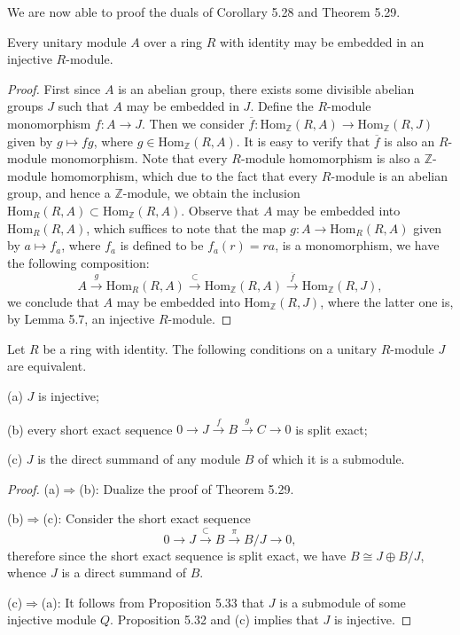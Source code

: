 We are now able to proof the duals of Corollary 5.28 and Theorem 5.29.
\begin{proposition}
Every unitary module $A$ over a ring $R$ with identity may be embedded in an injective $R$-module.
\end{proposition}
\begin{proof}
First since $A$ is an abelian group, there exists some divisible abelian groups $J$ such that $A$ may be embedded in $J$. Define the $R$-module monomorphism $f:A\to J$. Then we consider $\overline{f}:\mathrm{Hom}_\mathbb{Z}(R,A)\to\mathrm{Hom}_\mathbb{Z}(R,J)$ given by $g\mapsto fg$, where $g\in\mathrm{Hom}_\mathbb{Z}(R,A)$. It is easy to verify that $\overline{f}$ is also an $R$-module monomorphism. Note that every $R$-module homomorphism is also a $\mathbb{Z}$-module homomorphism, which due to the fact that every $R$-module is an abelian group, and hence a $\mathbb{Z}$-module, we obtain the inclusion $\mathrm{Hom}_R(R,A)\subset\mathrm{Hom}_\mathbb{Z}(R,A)$. Observe that $A$ may be embedded into $\mathrm{Hom}_R(R,A)$, which suffices to note that the map $g:A\to\mathrm{Hom}_R(R,A)$ given by $a\mapsto f_a$, where $f_a$ is defined to be $f_a(r)=ra$, is a monomorphism, we have the following composition: 
$$
A\overset{g}{\longrightarrow}\mathrm{Hom}_R\left( R,A \right) \overset{\subset}{\longrightarrow}\mathrm{Hom}_{\mathbb{Z}}\left( R,A \right) \overset{\overline{f}}{\longrightarrow}\mathrm{Hom}_{\mathbb{Z}}\left( R,J \right) ,
$$
we conclude that $A$ may be embedded into $\mathrm{Hom}_\mathbb{Z}(R,J)$, where the latter one is, by Lemma 5.7, an injective $R$-module.
\end{proof}
\begin{proposition}
Let $R$ be a ring with identity. The following conditions on a unitary $R$-module $J$ are equivalent.\par
(a) $J$ is injective;\par
(b) every short exact sequence $0\longrightarrow J\overset{f}{\longrightarrow}B\overset{g}{\longrightarrow}C\longrightarrow 0$ is split exact;\par
(c) $J$ is the direct summand of any module $B$ of which it is a submodule.
\end{proposition}
\begin{proof}
(a)$\Rightarrow$(b): Dualize the proof of Theorem 5.29.\par
(b)$\Rightarrow$(c): Consider the short exact sequence 
$$
0\longrightarrow J\overset{\subset}{\longrightarrow}B\overset{\pi}{\longrightarrow}B/J\longrightarrow 0,
$$
therefore since the short exact sequence is split exact, we have $B\cong J\oplus B/J$, whence $J$ is a direct summand of $B$.\par
(c)$\Rightarrow$(a): It follows from Proposition 5.33 that $J$ is a submodule of some injective module $Q$. Proposition 5.32 and (c) implies that $J$ is injective.
\end{proof}
